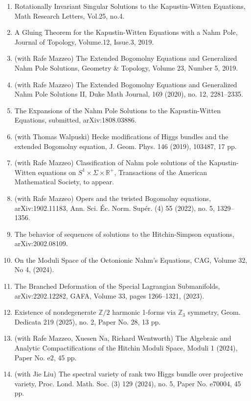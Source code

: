 \documentclass[a4paper,10pt]{article}
\begin{document}
\begin{enumerate}[leftmargin=1.5cm]
    \item Rotationally Invariant Singular Solutions to the Kapustin-Witten Equations, Math Research Letters, Vol.25, no.4.
    \item A Gluing Theorem for the Kapustin-Witten Equations with a Nahm Pole, Journal of Topology, Volume.12, Issue.3, 2019.
    \item (with Rafe Mazzeo) The Extended Bogomolny Equations and Generalized Nahm Pole Solutions, Geometry \& Topology, Volume 23, Number 5, 2019.
    \item (with Rafe Mazzeo) The Extended Bogomolny Equations and Generalized Nahm Pole Solutions II, Duke Math Journal, 169 (2020), no. 12, 2281–2335.
    \item The Expansions of the Nahm Pole Solutions to the Kapustin-Witten Equations, submitted, arXiv:1808.03886.
    \item (with Thomas Walpuski) Hecke modifications of Higgs bundles and the extended Bogomolny equation, J. Geom. Phys. 146 (2019), 103487, 17 pp.
    \item (with Rafe Mazzeo) Classification of Nahm pole solutions of the Kapustin-Witten equations on $S^1\times\Sigma\times \mathbb{R}^+$, Transactions of the American Mathematical Society, to appear.
    \item (with Rafe Mazzeo) Opers and the twisted Bogomolny equations, arXiv:1902.11183, Ann. Sci. Éc. Norm. Supér. (4) 55 (2022), no. 5, 1329–1356.
    \item The behavior of sequences of solutions to the Hitchin-Simpson equations, arXiv:2002.08109.
    \item On the Moduli Space of the Octonionic Nahm's Equations, CAG, Volume 32, No 4, (2024).
    \item The Branched Deformation of the Special Lagrangian Submanifolds, arXiv:2202.12282, GAFA, Volume 33, pages 1266–1321, (2023).
    \item Existence of nondegenerate $\mathbb{Z}/2$ harmonic 1-forms via $\mathbb{Z}_3$ symmetry, Geom. Dedicata 219 (2025), no. 2, Paper No. 28, 13 pp.
    \item (with Rafe Mazzeo, Xuesen Na, Richard Wentworth) The Algebraic and Analytic Compactifications of the Hitchin Moduli Space, Moduli 1 (2024), Paper No. e2, 45 pp.
    \item (with Jie Liu) The spectral variety of rank two Higgs bundle over projective variety, Proc. Lond. Math. Soc. (3) 129 (2024), no. 5, Paper No. e70004, 45 pp.

\end{enumerate}
\end{document}
